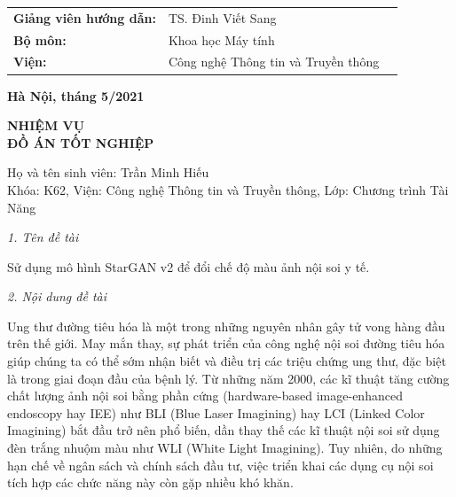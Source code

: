 \documentclass[12pt]{extreport}
\begin{document}
\vspace{1.5cm}
\begin{center}
    \begin{tabular}{l l c}
        \textbf{Giảng viên hướng dẫn:} & TS. Đinh Viết Sang                  & \hrulefill                                \\
        \textbf{Bộ môn:}               & Khoa học Máy tính                   & \fontsize{8pt}{1}\selectfont{Chữ kí GVHD} \\
        \textbf{Viện:}                 & Công nghệ Thông tin và Truyền thông &                                           \\
    \end{tabular}
\end{center}

\vspace{1.0cm}
\begin{center}
    \textbf{{Hà Nội, tháng 5/2021}}\\
\end{center}

\newpage

\begin{center}
    \fontsize{8pt}{1}
\end{center}

\vspace{1.0cm}
\begin{center}
    \large\textbf{NHIỆM VỤ \\
        ĐỒ ÁN TỐT NGHIỆP}
\end{center}

\vspace{0.5cm}
\justify
Họ và tên sinh viên: Trần Minh Hiếu \\
Khóa: K62, Viện: Công nghệ Thông tin và Truyền thông, Lớp: Chương trình Tài Năng

\textit{1. Tên đề tài}

Sử dụng mô hình StarGAN v2 để đổi chế độ màu ảnh nội soi y tế.

\textit{2. Nội dung đề tài}

Ung thư đường tiêu hóa là một trong những nguyên nhân gây tử vong hàng đầu trên thế giới. May mắn thay, sự phát triển của công nghệ nội soi đường tiêu hóa giúp chúng ta có thể sớm nhận biết và điều trị các triệu chứng ung thư, đặc biệt là trong giai đoạn đầu của bệnh lý. Từ những năm 2000, các kĩ thuật tăng cường chất lượng ảnh nội soi bằng phần cứng (hardware-based image-enhanced endoscopy hay IEE) như BLI (Blue Laser Imagining) hay LCI (Linked Color Imagining) bắt đầu trở nên phổ biến, dần thay thế các kĩ thuật nội soi sử dụng đèn trắng nhuộm màu như WLI (White Light Imagining). Tuy nhiên, do những hạn chế về ngân sách và chính sách đầu tư, việc triển khai các dụng cụ nội soi tích hợp các chức năng này còn gặp nhiều khó khăn.
\end{document}
